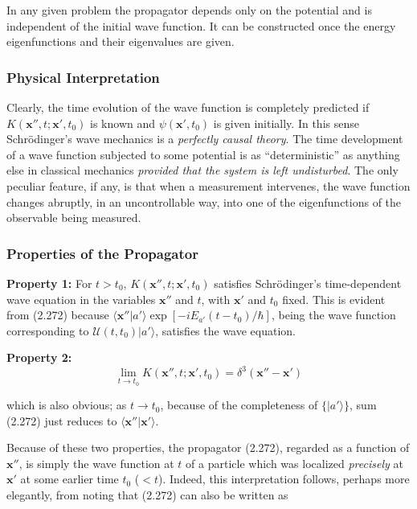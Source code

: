 \documentclass[11pt,a4paper]{article}
\begin{document}
In any given problem the propagator depends only on the potential and is independent of the initial wave function. It can be constructed once the energy eigenfunctions and their eigenvalues are given.

\subsubsection{Physical Interpretation}

Clearly, the time evolution of the wave function is completely predicted if $K(\mathbf{x}'', t; \mathbf{x}', t_0)$ is known and $\psi(\mathbf{x}', t_0)$ is given initially. In this sense Schrödinger's wave mechanics is a \textit{perfectly causal theory}. The time development of a wave function subjected to some potential is as ``deterministic'' as anything else in classical mechanics \textit{provided that the system is left undisturbed}. The only peculiar feature, if any, is that when a measurement intervenes, the wave function changes abruptly, in an uncontrollable way, into one of the eigenfunctions of the observable being measured.

\subsubsection{Properties of the Propagator}

\textbf{Property 1:} For $t > t_0$, $K(\mathbf{x}'', t; \mathbf{x}', t_0)$ satisfies Schrödinger's time-dependent wave equation in the variables $\mathbf{x}''$ and $t$, with $\mathbf{x}'$ and $t_0$ fixed. This is evident from (2.272) because $\langle \mathbf{x}''|a'\rangle\exp[-iE_{a'}(t - t_0)/\hbar]$, being the wave function corresponding to $\mathcal{U}(t, t_0)|a'\rangle$, satisfies the wave equation.

\textbf{Property 2:}
\begin{equation}
\lim_{t \to t_0} K(\mathbf{x}'', t; \mathbf{x}', t_0) = \delta^3(\mathbf{x}'' - \mathbf{x}')
\tag{2.273}
\end{equation}

which is also obvious; as $t \to t_0$, because of the completeness of $\{|a'\rangle\}$, sum (2.272) just reduces to $\langle \mathbf{x}''|\mathbf{x}'\rangle$.

Because of these two properties, the propagator (2.272), regarded as a function of $\mathbf{x}''$, is simply the wave function at $t$ of a particle which was localized \textit{precisely} at $\mathbf{x}'$ at some earlier time $t_0$ ($< t$). Indeed, this interpretation follows, perhaps more elegantly, from noting that (2.272) can also be written as
\end{document}
